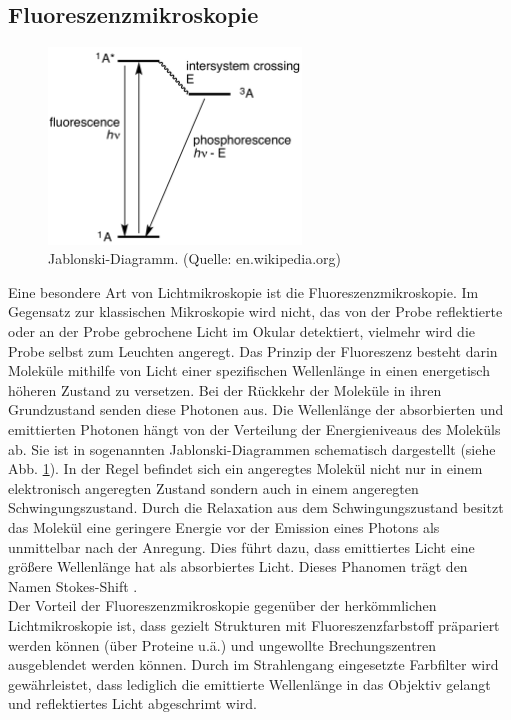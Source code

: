 \subsection{Fluoreszenzmikroskopie}
\begin{figure}
	\centering
	\includegraphics[width=0.6\textwidth]{plots/jablonski.png}
	\caption{Jablonski-Diagramm. (Quelle: en.wikipedia.org)}\label{fig:jablonski}
\end{figure}
Eine besondere Art von Lichtmikroskopie ist die Fluoreszenzmikroskopie.
Im Gegensatz zur klassischen Mikroskopie wird nicht, das von der Probe reflektierte oder an der Probe gebrochene Licht im Okular detektiert, vielmehr wird die Probe selbst zum Leuchten angeregt.
Das Prinzip der Fluoreszenz besteht darin Moleküle mithilfe von Licht einer spezifischen Wellenlänge in einen energetisch höheren Zustand zu versetzen. 
Bei der Rückkehr der Moleküle in ihren Grundzustand senden diese Photonen aus. 
Die Wellenlänge der absorbierten und emittierten Photonen hängt von der Verteilung der Energieniveaus des Moleküls ab. Sie ist in sogenannten Jablonski-Diagrammen schematisch dargestellt (siehe Abb. \ref{fig:jablonski}).
In der Regel befindet sich ein angeregtes Molekül nicht nur in einem elektronisch angeregten Zustand sondern auch in einem angeregten Schwingungszustand.
Durch die Relaxation aus dem Schwingungszustand besitzt das Molekül eine geringere Energie vor der Emission eines Photons als unmittelbar nach der Anregung.
Dies führt dazu, dass emittiertes Licht eine größere Wellenlänge hat als absorbiertes Licht. Dieses Phanomen trägt den Namen Stokes-Shift \cite{haken}.
\\
Der Vorteil der Fluoreszenzmikroskopie gegenüber der herkömmlichen Lichtmikroskopie ist, dass gezielt Strukturen mit Fluoreszenzfarbstoff präpariert werden können (über Proteine u.ä.) und ungewollte Brechungszentren ausgeblendet werden können.
Durch im Strahlengang eingesetzte Farbfilter wird gewährleistet, dass lediglich die emittierte Wellenlänge in das Objektiv gelangt und reflektiertes Licht abgeschrimt wird.
